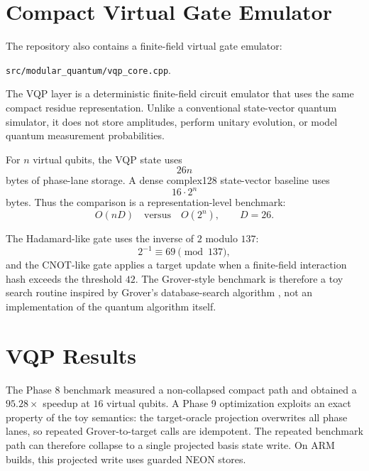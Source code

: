 \documentclass[11pt]{article}
\begin{document}
\section{Compact Virtual Gate Emulator}

The repository also contains a finite-field virtual gate emulator:
\begin{center}
\texttt{src/modular\_quantum/vqp\_core.cpp}.
\end{center}
The VQP layer is a deterministic finite-field circuit emulator that uses the
same compact residue representation.  Unlike a conventional state-vector
quantum simulator, it does not store amplitudes, perform unitary evolution, or
model quantum measurement probabilities.

For $n$ virtual qubits, the VQP state uses
\begin{equation}
    26n
\end{equation}
bytes of phase-lane storage.  A dense complex128 state-vector baseline uses
\begin{equation}
    16\cdot2^n
\end{equation}
bytes.  Thus the comparison is a representation-level benchmark:
\begin{equation}
    O(nD)\quad\mathrm{versus}\quad O(2^n),
    \qquad D=26.
\end{equation}

The Hadamard-like gate uses the inverse of $2$ modulo $137$:
\begin{equation}
    2^{-1}\equiv69\pmod{137},
\end{equation}
and the CNOT-like gate applies a target update when a finite-field interaction
hash exceeds the threshold $42$.  The Grover-style benchmark is therefore a toy
search routine inspired by Grover's database-search algorithm
\cite{grover1996}, not an implementation of the quantum algorithm itself.

\section{VQP Results}

The Phase 8 benchmark measured a non-collapsed compact path and obtained a
$95.28\times$ speedup at $16$ virtual qubits.  A Phase 9 optimization exploits
an exact property of the toy semantics: the target-oracle projection overwrites
all phase lanes, so repeated Grover-to-target calls are idempotent.  The
repeated benchmark path can therefore collapse to a single projected basis
state write.  On ARM builds, this projected write uses guarded NEON stores.
\end{document}
